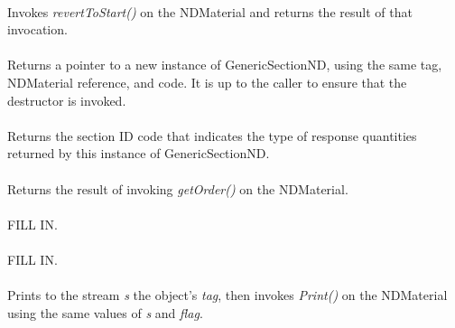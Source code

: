  \\
Invokes {\em revertToStart()} on the NDMaterial and returns the
result of that invocation. \\

 \\
Returns a pointer to a new instance of GenericSectionND, using the
same tag, NDMaterial reference, and code. It is up to the caller to
ensure that the destructor is invoked. \\

 \\
Returns the section ID code that indicates the type of response quantities
returned by this instance of GenericSectionND. \\

 \\
Returns the result of invoking {\em getOrder()} on the NDMaterial. \\

\\
FILL IN. \\

\\
FILL IN. \\

 \\
Prints to the stream {\em s} the object's {\em tag}, then invokes
{\em Print()} on the NDMaterial using the same values of {\em s}
and {\em flag}. \\
